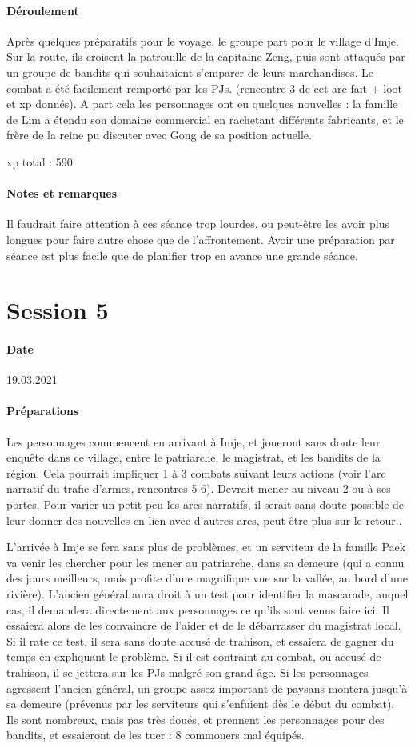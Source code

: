 \documentclass[10pt,a4paper]{book}
\begin{document}
\paragraph{Déroulement}
Après quelques préparatifs pour le voyage, le groupe part pour le village d'Imje. Sur la route, ils croisent la patrouille de la capitaine Zeng, puis sont attaqués par un groupe de bandits qui souhaitaient s'emparer de leurs marchandises. Le combat a été facilement remporté par les PJs. (rencontre 3 de cet arc fait + loot et xp donnés). A part cela les personnages ont eu quelques nouvelles : la famille de Lim a étendu son domaine commercial en rachetant différents fabricants, et le frère de la reine pu discuter avec Gong de sa position actuelle.

xp total : 590
\paragraph{Notes et remarques}
Il faudrait faire attention à ces séance trop lourdes, ou peut-être les avoir plus longues pour faire autre chose que de l'affrontement. Avoir une préparation par séance est plus facile que de planifier trop en avance une grande séance.
\section{Session 5}
\paragraph{Date}19.03.2021
\paragraph{Préparations}
Les personnages commencent en arrivant à Imje, et joueront sans doute leur enquête dans ce village, entre le patriarche, le magistrat, et les bandits de la région. Cela pourrait impliquer 1 à 3 combats suivant leurs actions (voir l'arc narratif du trafic d'armes, rencontres 5-6). Devrait mener au niveau 2 ou à ses portes. Pour varier un petit peu les arcs narratifs, il serait sans doute possible de leur donner des nouvelles en lien avec d'autres arcs, peut-être plus sur le retour.. 

L'arrivée à Imje se fera sans plus de problèmes, et un serviteur de la famille Paek va venir les chercher pour les mener au patriarche, dans sa demeure (qui a connu des jours meilleurs, mais profite d'une magnifique vue sur la vallée, au bord d'une rivière). L'ancien général aura droit à un test pour identifier la mascarade, auquel cas, il demandera directement aux personnages ce qu'ils sont venus faire ici. Il essaiera alors de les convaincre de l'aider et de le débarrasser du magistrat local. Si il rate ce test, il sera sans doute accusé de trahison, et essaiera de gagner du temps en expliquant le problème. Si il est contraint au combat, ou accusé de trahison, il se jettera sur les PJs malgré son grand âge. Si les personnages agressent l'ancien général, un groupe assez important de paysans montera jusqu'à sa demeure (prévenus par les serviteurs qui s'enfuient dès le début du combat). Ils sont nombreux, mais pas très doués, et prennent les personnages pour des bandits, et essaieront de les tuer : 8 commoners mal équipés.
\end{document}
